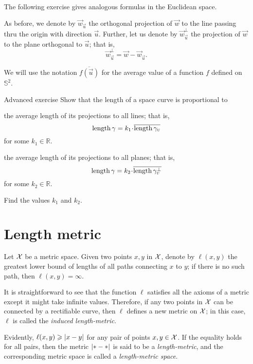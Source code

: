 The following exercise gives analogous formulas in the Euclidean space.

As before, we denote by $\vec w_{\vec u}$ the orthogonal projection of $\vec w$ to the line passing thru the origin with direction $\vec u$.
Further, let us denote by $\vec w_{\vec u}^\bot$ the projection of $\vec w$ to the plane orthogonal to $\vec u$;
that is,
\[\vec w_\vec u^\bot=\vec w - \vec w_{\vec u}.\]

We will use the notation 
$\overline{f(\vec u)}$ for the average value
of a function $f$ defined on $\mathbb{S}^2$.

\begin{thm}{Advanced exercise}\label{adex:more-croftons}
Show that the length of a space curve is proportional to 
\begin{subthm}{}
the average length of its projections to all lines; that is,
\[\length\gamma=k_1\cdot\overline{\length\gamma_{\vec u}}\]
for some $k_1 \in \mathbb{R}$.
\end{subthm}
\begin{subthm}{}the average length of its projections to all planes; that is,
\[\length\gamma=k_2\cdot\overline{\length\gamma_{\vec u}^\bot}\]
for some $k_2 \in \mathbb{R}$.
\end{subthm}
Find the values $k_1$ and $k_2$.
\end{thm}

\section{Length metric}\label{sec:Length metric}

Let $\mathcal{X}$ be a metric space.
Given two points $x,y$ in $\mathcal{X}$, denote by $\ell(x,y)$ the greatest lower bound of lengths of all paths connecting $x$ to $y$; if there is no such path, then $\ell(x,y)=\infty$.

It is straightforward to see that the function $\ell$ satisfies all the axioms of a metric except it might take infinite values.
Therefore, if any two points in $\mathcal{X}$ can be connected by a rectifiable curve, then $\ell$ defines a new metric on $\mathcal{X}$;
in this case, $\ell$ is called the \emph{induced length-metric}.

Evidently, $\ell(x,y)\ge \dist{x}{y}{}$ for any pair of points $x,y\in \mathcal{X}$.
If the equality holds for all pairs, then the metric $\dist{{*}}{{*}}{}$ is said to be a \emph{length-metric}, and the corresponding metric space is called a \index{}\emph{length-metric space}.

